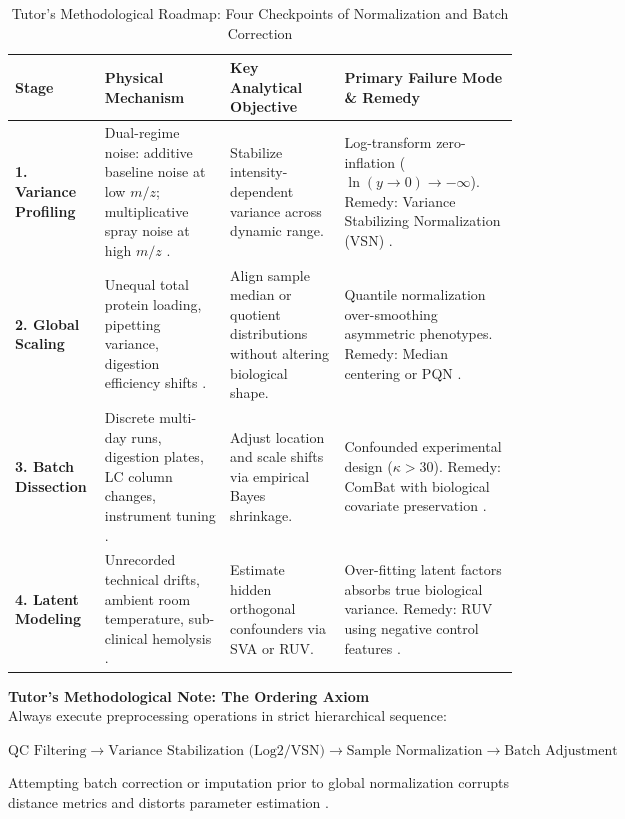 \documentclass[11pt,oneside]{book}
\begin{document}
\begin{table}[ht]
\centering
\caption{Tutor's Methodological Roadmap: Four Checkpoints of Normalization and Batch Correction}
\label{tab:norm_roadmap}
\small
\begin{tabularx}{\textwidth}{l p{3.8cm} p{4.2cm} X}
\toprule
\textbf{Stage} & \textbf{Physical Mechanism} & \textbf{Key Analytical Objective} & \textbf{Primary Failure Mode \& Remedy} \\
\midrule
\textbf{1. Variance Profiling} & Dual-regime noise: additive baseline noise at low $m/z$; multiplicative spray noise at high $m/z$ \cite{rocke1995two}. & Stabilize intensity-dependent variance across dynamic range. & Log-transform zero-inflation ($\ln(y \to 0) \to -\infty$). Remedy: Variance Stabilizing Normalization (VSN) \cite{huber2002variance}. \\
\addlinespace
\textbf{2. Global Scaling} & Unequal total protein loading, pipetting variance, digestion efficiency shifts \cite{callister2006normalization}. & Align sample median or quotient distributions without altering biological shape. & Quantile normalization over-smoothing asymmetric phenotypes. Remedy: Median centering or PQN \cite{dieterle2006probabilistic}. \\
\addlinespace
\textbf{3. Batch Dissection} & Discrete multi-day runs, digestion plates, LC column changes, instrument tuning \cite{johnson2007adjusting, leek2010tackling}. & Adjust location and scale shifts via empirical Bayes shrinkage. & Confounded experimental design ($\kappa > 30$). Remedy: ComBat with biological covariate preservation \cite{nygaard2016methods}. \\
\addlinespace
\textbf{4. Latent Modeling} & Unrecorded technical drifts, ambient room temperature, sub-clinical hemolysis \cite{leek2007capturing, gagnon2012using}. & Estimate hidden orthogonal confounders via SVA or RUV. & Over-fitting latent factors absorbs true biological variance. Remedy: RUV using negative control features \cite{risso2014normalization}. \\
\bottomrule
\end{tabularx}
\end{table}

\begin{notebox}
\textbf{Tutor's Methodological Note: The Ordering Axiom}\\
Always execute preprocessing operations in strict hierarchical sequence:
\begin{center}
\small
$\text{QC Filtering} \longrightarrow \text{Variance Stabilization (Log2/VSN)} \longrightarrow \text{Sample Normalization} \longrightarrow \text{Batch Adjustment}$
\end{center}
Attempting batch correction or imputation prior to global normalization corrupts distance metrics and distorts parameter estimation \cite{valikangas2018systematic, lazar2016accounting}.
\end{notebox}
\end{document}
